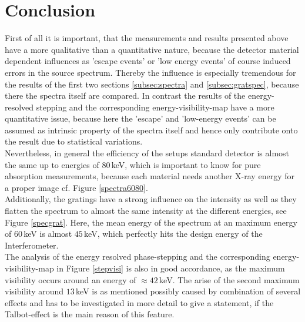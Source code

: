 \section{Conclusion}
First of all it is important, that the measurements and results presented above have a more qualitative than a quantitative nature, because the detector material dependent influences as 'escape events' or 'low energy events' of course induced errors in the source spectrum. Thereby the influence is especially tremendous for the results of the first two sections \ref{subsec:spectra} and \ref{subsec:gratspec}, because there the spectra itself are compared. In contrast the results of the energy-resolved stepping and the corresponding energy-visibility-map have a more quantitative issue, because here the 'escape' and 'low-energy events' can be assumed as intrinsic property of the spectra itself and hence only contribute onto the result due to statistical variations.\\ 
Nevertheless, in general the efficiency of the setups standard detector is almost the same up to energies of $80\,$keV, which is important to know for pure absorption measurements, because each material needs another X-ray energy for a proper image cf. Figure \ref{spectra6080}.\\
Additionally, the gratings have a strong influence on the intensity as well as they flatten the spectrum to almost the same intensity at the different energies, see Figure \ref{specgrat}. Here, the mean energy of the spectrum at an maximum energy of $60\,$keV is almost $45\,$keV, which perfectly hits the design energy of the Interferometer.\\ 
The analysis of the energy resolved phase-stepping and the corresponding energy-visibility-map in Figure \ref{stepvisi} is also in good accordance, as the maximum visibility occurs around an energy of $\approx 42\,$keV. The arise of the second maximum visibility around $13\,$keV is as mentioned possibly caused by combination of several effects and has to be investigated in more detail to give a statement, if the Talbot-effect is the main reason of this feature. 
